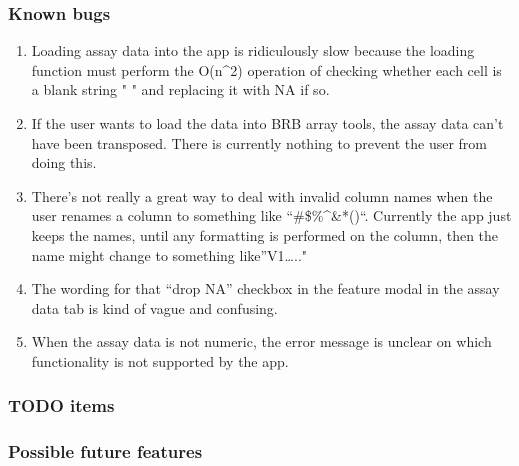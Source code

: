 \documentclass[]{article}
\providecommand{\tightlist}{%
  \setlength{\itemsep}{0pt}\setlength{\parskip}{0pt}}
\begin{document}
\hypertarget{known-bugs}{\subsubsection{Known bugs}\label{known-bugs}}

\begin{enumerate}
\def\labelenumi{\arabic{enumi}.}
\tightlist
\item
  Loading assay data into the app is ridiculously slow because the
  loading function must perform the O(n\^{}2) operation of checking
  whether each cell is a blank string " " and replacing it with NA if
  so.
\item
  If the user wants to load the data into BRB array tools, the assay
  data can't have been transposed. There is currently nothing to prevent
  the user from doing this.
\item
  There's not really a great way to deal with invalid column names when
  the user renames a column to something like ``\#\$\%\^{}\&*()``.
  Currently the app just keeps the names, until any formatting is
  performed on the column, then the name might change to something
  like''V1\ldots{}.."
\item
  The wording for that ``drop NA'' checkbox in the feature modal in the
  assay data tab is kind of vague and confusing.
\item
  When the assay data is not numeric, the error message is unclear on
  which functionality is not supported by the app.
\end{enumerate}

\hypertarget{todo-items}{\subsubsection{TODO items}\label{todo-items}}

\hypertarget{future-features}{\subsubsection{Possible future
features}\label{future-features}}
\end{document}
